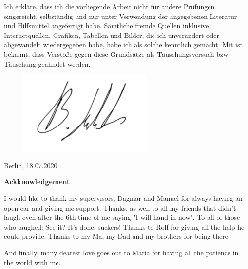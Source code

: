 \documentclass[10pt]{article}
\begin{document}
Ich erkl\"are, dass ich die vorliegende Arbeit nicht f\"ur andere Pr\"ufungen eingereicht, selbst\"andig und nur unter Verwendung der angegebenen Literatur und Hilfsmittel angefertigt habe. S\"amtliche fremde Quellen inklusive Internetquellen, Grafiken, Tabellen und Bilder, die ich unver\"andert oder abgewandelt wiedergegeben habe, habe ich als solche kenntlich gemacht. Mit ist bekannt, dass Verst\"oße gegen diese Grunds\"atze als T\"auschungsversuch bzw. T\"auschung geahndet werden.


\begin{figure}[H]
\includegraphics[width=.3\columnwidth]{sig.png}
\end{figure}

Berlin, 18.07.2020


\newpage
\huge{\textbf{Ackknowledgement}} \\
\large{
I would like to thank my supervisors, Dagmar and Manuel for always having an open ear and giving me support. 
Thanks, as well to all my friends that didn't laugh even after the 6th time of me saying "I will hand in now".
To all of those who laughed: See it? It's done, suckers! 
Thanks to Rolf for giving all the help he could provide.
Thanks to my Ma, my Dad and my brothers for being there.

And finally, many dearest love goes out to Maria for having all the patience in the world with me. 
}
\end{document}
